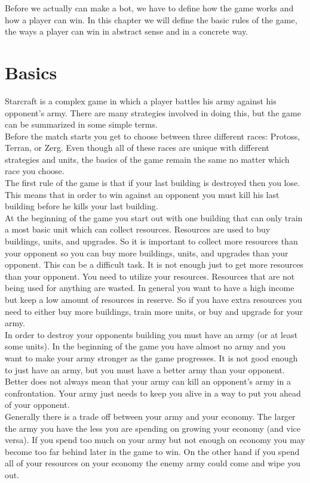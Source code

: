 Before we actually can make a bot, we have to define how the game works and how a player can win.
In this chapter we will define the basic rules of the game, the ways a player can win in abstract sense and in a concrete way.

\section{Basics}
	Starcraft is a complex game in which a player battles his army against his opponent's army. 
	There are many strategies involved in doing this, but the game can be summarized in some simple terms.\\
	
	Before the match starts you get to choose between three different races: Protoss, Terran, or Zerg. 
	Even though all of these races are unique with different strategies and units, 
	the basics of the game remain the same no matter which race you choose.\\
	
	The first rule of the game is that if your last building is destroyed then you lose. 
	This means that in order to win against an opponent you must kill his last building before he kills your last building. \\
	
	At the beginning of the game you start out with one building that can only train a most basic unit which can collect resources. 
	Resources are used to buy buildings, units, and upgrades. 
	So it is important to collect more resources than your opponent so you can buy more buildings, units, and upgrades than your opponent.
	This can be a difficult task. It is not enough just to get more resources than your opponent. 
	You need to utilize your resources. Resources that are not being used for anything are wasted. 
	In general you want to have a high income but keep a low amount of resources in reserve. 
	So if you have extra resources you need to either buy more buildings, train more units, or buy and upgrade for your army.\\
	
	In order to destroy your opponents building you must have an army (or at least some units). 
	In the beginning of the game you have almost no army and you want to make your army stronger as the game progresses. 
	It is not good enough to just have an army, but you must have a better army than your opponent. 
	Better does not always mean that your army can kill an opponent's army in a confrontation. 
	Your army just needs to keep you alive in a way to put you ahead of your opponent.\\
	
	Generally there is a trade off between your army and your economy. 
	The larger the army you have the less you are spending on growing your economy (and vice versa). 
	If you spend too much on your army but not enough on economy you may become too far behind later in the game to win. 
	On the other hand if you spend all of your resources on your economy the enemy army could come and wipe you out.\\

 